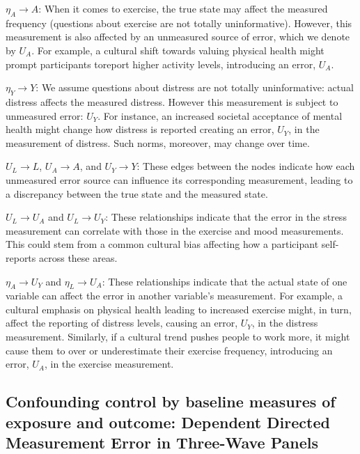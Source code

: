 \documentclass[
  singlecolumn]{report}
\begin{document}
\(\eta_A \rightarrow A\): When it comes to exercise, the true state may
affect the measured frequency (questions about exercise are not totally
uninformative). However, this measurement is also affected by an
unmeasured source of error, which we denote by \(U_{A}\). For example, a
cultural shift towards valuing physical health might prompt participants
toreport higher activity levels, introducing an error, \(U_{A}\).

\(\eta_Y \rightarrow Y\): We assume questions about distress are not
totally uninformative: actual distress affects the measured distress.
However this measurement is subject to unmeasured error: \(U_{Y}\). For
instance, an increased societal acceptance of mental health might change
how distress is reported creating an error, \(U_{Y}\), in the
measurement of distress. Such norms, moreover, may change over time.

\(U_{L} \rightarrow L\), \(U_{A} \rightarrow A\), and
\(U_{Y} \rightarrow Y\): These edges between the nodes indicate how each
unmeasured error source can influence its corresponding measurement,
leading to a discrepancy between the true state and the measured state.

\(U_{L} \rightarrow U_{A}\) and \(U_{L} \rightarrow U_{Y}\): These
relationships indicate that the error in the stress measurement can
correlate with those in the exercise and mood measurements. This could
stem from a common cultural bias affecting how a participant
self-reports across these areas.

\(\eta_A \rightarrow U_{Y}\) and \(\eta_L \rightarrow U_{A}\): These
relationships indicate that the actual state of one variable can affect
the error in another variable's measurement. For example, a cultural
emphasis on physical health leading to increased exercise might, in
turn, affect the reporting of distress levels, causing an error,
\(U_{Y}\), in the distress measurement. Similarly, if a cultural trend
pushes people to work more, it might cause them to over or underestimate
their exercise frequency, introducing an error, \(U_{A}\), in the
exercise measurement.

\hypertarget{confounding-control-by-baseline-measures-of-exposure-and-outcome-dependent-directed-measurement-error-in-three-wave-panels}{%
\subsection{Confounding control by baseline measures of exposure and
outcome: Dependent Directed Measurement Error in Three-Wave
Panels}\label{confounding-control-by-baseline-measures-of-exposure-and-outcome-dependent-directed-measurement-error-in-three-wave-panels}}
\end{document}
